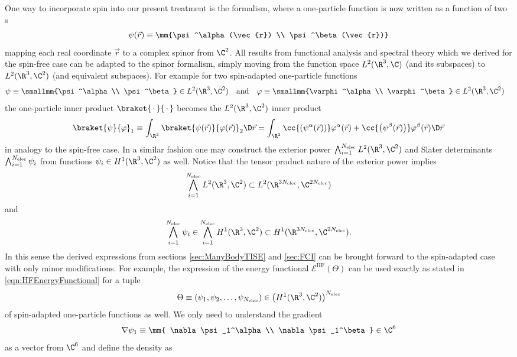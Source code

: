 \begin{rem}
	One way to incorporate spin into our present treatment
	is the  formalism,
	where a one-particle function is now written as a function of two
	s
	\begin{equation}
		\psi(\vec{r}) \equiv \mm{\psi^\alpha(\vec{r}) \\ \psi^\beta(\vec{r})}
		\label{eqn:OneParticleSpinor}
	\end{equation}
	mapping each real coordinate $\vec{r}$ to a complex spinor from $\C^2$.
	All results from functional analysis and spectral theory
	which we derived for the spin-free case can be adapted to the
	spinor formalism,
	simply moving from the function space $L^2(\R^3, \C)$
	(and its subspaces) to $L^2(\R^3, \C^2)$ (and equivalent subspaces).
	For example for two spin-adapted one-particle functions
	\begin{align*}
		\psi &\equiv \smallmm{\psi^\alpha\\ \psi^\beta} \in L^2(\R^3, \C^2)
		&&\text{and} &
		\varphi &\equiv \smallmm{\varphi^\alpha\\ \varphi^\beta} \in L^2(\R^3, \C^2)
	\end{align*}
	the one-particle inner product $\braket{\slot}{\slot}$ becomes
	the $L^2(\R^3, \C^2)$ inner product
	\[ \braket{\psi}{\varphi}_1 \equiv
		\int_{\R^3} \braket{\psi(\vec{r})}{\varphi(\vec{r})}_{2} \D \vec{r}
		= \int_{\R^3}
			\cc{\left(\psi^\alpha(\vec{r})\right)} \varphi^\alpha(\vec{r})
			+
			\cc{\left(\psi^\beta(\vec{r})\right)} \varphi^\beta(\vec{r})
		\D \vec{r}
	\]
	in analogy to the spin-free case.
	In a similar fashion one may construct the exterior power
	$\bigwedge_{i=1}^{\Nelec} L^2(\R^3, \C^2)$
	and Slater determinants $\bigwedge_{i=1}^{N_\text{elec}} \psi_i$
	from functions $\psi_i \in H^1(\R^3, \C^2)$ as well.
	Notice that the tensor product nature of the exterior power implies
	\[ \bigwedge_{i=1}^{\Nelec} L^2(\R^3, \C^2) \subset L^2(\R^{3\Nelec}, \C^{2\Nelec}) \]
	and
	\begin{equation}
		\bigwedge_{i=1}^{\Nelec} \psi_i \in \bigwedge_{i=1}^{\Nelec} H^1(\R^3, \C^2)
		\subset H^1(\R^{3\Nelec}, \C^{2\Nelec}).
		\label{eqn:SpinAnsatzSpace}
	\end{equation}
	In this sense the derived expressions
	from sections \ref{sec:ManyBodyTISE} and \ref{sec:FCI}
	can be brought forward to the spin-adapted case with only minor modifications.
	For example, the expression of the \HF energy functional
	$\mathcal{E}^\text{HF}(\Theta)$ can be used exactly as stated in
	\eqref{eqn:HFEnergyFunctional}
	for a tuple
	\[ \Theta \equiv \left(\psi_1, \psi_2, \ldots, \psi_{\Nelec}\right)
		\in \left(H^1(\R^3, \C^2)\right)^{\Nelec} \]
	of spin-adapted one-particle functions as well.
	We only need to understand the gradient
	\[ \nabla \psi_1 \equiv \mm{ \nabla \psi_1^\alpha \\ \nabla \psi_1^\beta } \in \C^6 \]
	as a vector from $\C^6$
	and define the density as


\end{rem}
